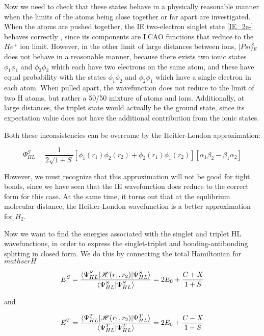Now we need to check that these states behave in a physically reasonable manner when the limits of the atoms being close together or far apart are investigated. When the atoms are pushed together, the IE two-electron singlet state \ref{IE_2e-} behaves correctly , since its components are LCAO functions that reduce to the $He^+$ ion limit. However, in the other limit of large distances between ions, $|Psi_{IE}^S$ does not behave in a reasonable manner, because there exists two ionic states $\phi_1\phi_1$ and $\phi_2\phi_2$ which each have two electrons on the same atom, and these have equal probability with the states $\phi_1\phi_2$ and $\phi_2\phi_1$ which have a single electron in each atom. When pulled apart, the wavefunction does not reduce to the limit of two H atoms, but rather a 50/50 mixture of atoms and ions. Additionally, at large distances, the triplet state would actually be the ground state, since its expectation value does not have the additional contribution from the ionic states. 

Both these inconsistencies can be overcome by the Heitler-London approximation:

\begin{equation}
\Psi_{HL}^S = \frac{1}{2\sqrt{1+S}}[\phi_1(r_1)\phi_2(r_2)+\phi_2(r_1)\phi_1(r_2)][\alpha_1\beta_2-\beta_1\alpha_2]
\end{equation}

However, we must recognize that this approximation will not be good for tight bonds, since we have seen that the IE wavefunction does reduce to the correct form for this case. At the same time, it turns out that at the equlibrium molecular distance, the Heitler-London wavefunction is a better approximation for $H_2$.

Now we want to find the energies associated with the singlet and triplet HL wavefunctions, in order to express the singlet-triplet and bonding-antibonding splitting in closed form. We do this by connecting the total Hamiltonian for $mathscr{H}$

\begin{equation}
E^S=\frac{\braket{\Psi_{HL}^S|\mathscr{H}(r_1,r_2)|\Psi_{HL}^S}}{\braket{\Psi_{HL}^S|\Psi_{HL}^S}}
= 2E_0+\frac{C+X}{1+S}
\end{equation}

and

\begin{equation}
E^T=\frac{\braket{\Psi_{HL}^T|\mathscr{H}(r_1,r_2)|\Psi_{HL}^T}}{\braket{\Psi_{HL}^T|\Psi_{HL}^T}}
= 2E_0+\frac{C-X}{1-S}
\label{HLenSin}
\end{equation}

